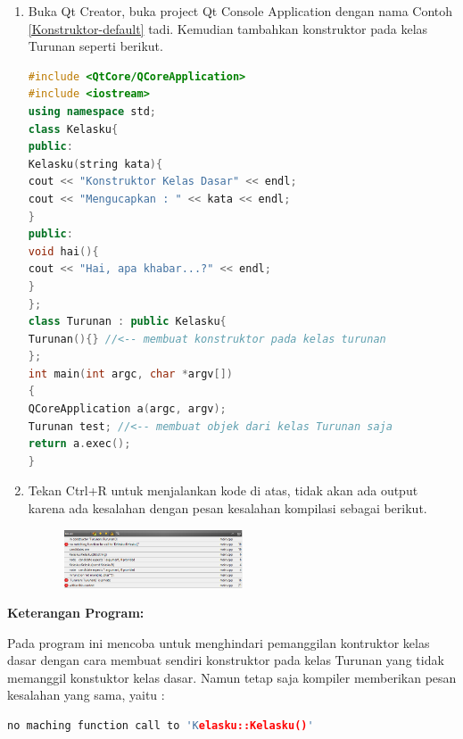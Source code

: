 \begin{enumerate}
\def\labelenumi{\arabic{enumi}.}
\item
  Buka Qt Creator, buka project Qt Console Application dengan nama
  Contoh \ref{Konstruktor-default} tadi. Kemudian tambahkan konstruktor pada kelas Turunan
  seperti berikut.

\begin{lstlisting}[language=c++, caption=Konstruktor kelas turunan harus memanggil salah satu konstruktor kelas dasar, label=Konstruktor-kelas-turunan-harus-memanggil-salah-satu-konstruktor-kelas-dasar]
#include <QtCore/QCoreApplication>
#include <iostream>
using namespace std;
class Kelasku{
public:
Kelasku(string kata){
cout << "Konstruktor Kelas Dasar" << endl;
cout << "Mengucapkan : " << kata << endl;
}
public:
void hai(){
cout << "Hai, apa khabar...?" << endl;
}
};
class Turunan : public Kelasku{
Turunan(){} //<-- membuat konstruktor pada kelas turunan
};
int main(int argc, char *argv[])
{
QCoreApplication a(argc, argv);
Turunan test; //<-- membuat objek dari kelas Turunan saja
return a.exec();
}
\end{lstlisting}
\item
  Tekan Ctrl+R untuk menjalankan kode di atas, tidak akan ada output
  karena ada kesalahan dengan pesan kesalahan kompilasi sebagai berikut.
  
  \begin{figure}[htbp]
  	\centering
  	\includegraphics[width=0.5\textwidth]{images/capture7-3.png}
  	
  \end{figure}
\end{enumerate}



\textbf{Keterangan Program:}

Pada program ini mencoba untuk menghindari pemanggilan kontruktor kelas
dasar dengan cara membuat sendiri konstruktor pada kelas Turunan yang
tidak memanggil konstuktor kelas dasar. Namun tetap saja kompiler
memberikan pesan kesalahan yang sama, yaitu :

\begin{lstlisting}[language=c++, numbers=none]
no maching function call to 'Kelasku::Kelasku()' 
\end{lstlisting}


